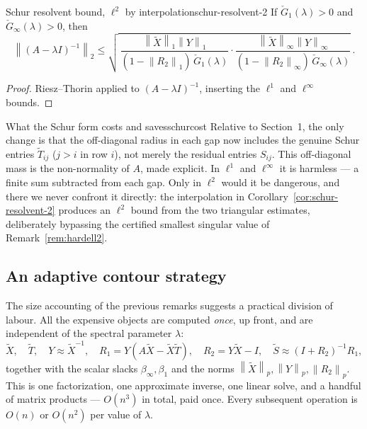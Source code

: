 \documentclass[11pt, a4paper]{article}
\numberwithin{equation}{section}
\newcommand{\norm}[1]{\left\|#1\right\|}
\newcommand{\tX}{\widetilde{X}}
\newcommand{\tT}{\widetilde{T}}
\begin{document}
\begin{corollary}{Schur resolvent bound, $\ell^2$ by interpolation}{schur-resolvent-2}
  If $\check G_1(\lambda) > 0$ and $\check G_\infty(\lambda) > 0$, then
  \[
    \norm{(A - \lambda I)^{-1}}_2
      \le \sqrt{\,\frac{\norm{\tX}_1\norm{Y}_1}{(1-\norm{R_2}_1)\,\check G_1(\lambda)}
                 \cdot
                 \frac{\norm{\tX}_\infty\norm{Y}_\infty}{(1-\norm{R_2}_\infty)\,\check G_\infty(\lambda)}}\,.
  \]
\end{corollary}

\begin{proof}
Riesz--Thorin applied to $(A - \lambda I)^{-1}$, inserting the $\ell^1$ and
$\ell^\infty$ bounds.
\end{proof}

\begin{remark}{What the Schur form costs and saves}{schurcost}
  Relative to Section~1, the only change is that the off-diagonal radius in each
  gap now includes the genuine Schur entries $\tT_{ij}$ ($j > i$ in row $i$),
  not merely the residual entries $S_{ij}$.  This off-diagonal mass is the
  non-normality of $A$, made explicit.  In $\ell^1$ and $\ell^\infty$ it is
  harmless --- a finite sum subtracted from each gap.  Only in $\ell^2$ would it
  be dangerous, and there we never confront it directly: the interpolation in
  Corollary~\ref{cor:schur-resolvent-2} produces an $\ell^2$ bound from the two
  triangular estimates, deliberately bypassing the certified smallest singular
  value of Remark~\ref{rem:hardell2}.
\end{remark}



\subsection{An adaptive contour strategy}

The size accounting of the previous remarks suggests a practical division of
labour.  All the expensive objects are computed \emph{once}, up front, and are
independent of the spectral parameter $\lambda$:
\[
  \tX, \quad \tT, \quad Y \approx \tX^{-1}, \quad
  R_1 = Y(A\tX - \tX\tT), \quad R_2 = Y\tX - I, \quad
  \tilde S \approx (I+R_2)^{-1}R_1,
\]
together with the scalar slacks $\beta_\infty, \beta_1$ and the norms
$\norm{\tX}_p, \norm{Y}_p, \norm{R_2}_p$.  This is one factorization, one
approximate inverse, one linear solve, and a handful of matrix products ---
$O(n^3)$ in total, paid once.  Every subsequent operation is $O(n)$ or $O(n^2)$
per value of $\lambda$.
\end{document}

